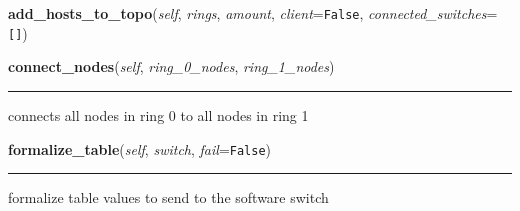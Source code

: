 \hspace{.8\funcindent}\begin{boxedminipage}{\funcwidth}

    \raggedright \textbf{add\_hosts\_to\_topo}(\textit{self}, \textit{rings}, \textit{amount}, \textit{client}={\tt False}, \textit{connected\_switches}={\tt \texttt{[}\texttt{]}})

\setlength{\parskip}{2ex}
\setlength{\parskip}{1ex}
    \end{boxedminipage}

    \label{make_topology:topo_tracker:connect_nodes}

    \vspace{0.5ex}

\hspace{.8\funcindent}\begin{boxedminipage}{\funcwidth}

    \raggedright \textbf{connect\_nodes}(\textit{self}, \textit{ring\_0\_nodes}, \textit{ring\_1\_nodes})

    \vspace{-1.5ex}

    \rule{\textwidth}{0.5\fboxrule}
\setlength{\parskip}{2ex}
    connects all nodes in ring 0 to all nodes in ring 1

\setlength{\parskip}{1ex}
    \end{boxedminipage}

    \label{make_topology:topo_tracker:formalize_table}

    \vspace{0.5ex}

\hspace{.8\funcindent}\begin{boxedminipage}{\funcwidth}

    \raggedright \textbf{formalize\_table}(\textit{self}, \textit{switch}, \textit{fail}={\tt False})

    \vspace{-1.5ex}

    \rule{\textwidth}{0.5\fboxrule}
\setlength{\parskip}{2ex}
    formalize table values to send to the software switch

\setlength{\parskip}{1ex}
    \end{boxedminipage}

